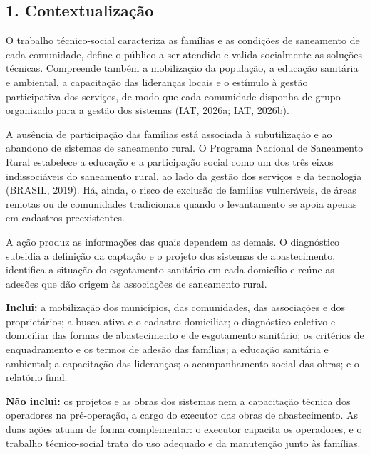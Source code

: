
{}
\subsection*{1. Contextualização}

O trabalho técnico-social caracteriza as famílias e as condições de saneamento de cada comunidade, define o público a ser atendido e valida socialmente as soluções técnicas. Compreende também a mobilização da população, a educação sanitária e ambiental, a capacitação das lideranças locais e o estímulo à gestão participativa dos serviços, de modo que cada comunidade disponha de grupo organizado para a gestão dos sistemas (IAT, 2026a; IAT, 2026b).

A ausência de participação das famílias está associada à subutilização e ao abandono de sistemas de saneamento rural. O Programa Nacional de Saneamento Rural estabelece a educação e a participação social como um dos três eixos indissociáveis do saneamento rural, ao lado da gestão dos serviços e da tecnologia (BRASIL, 2019). Há, ainda, o risco de exclusão de famílias vulneráveis, de áreas remotas ou de comunidades tradicionais quando o levantamento se apoia apenas em cadastros preexistentes.

A ação produz as informações das quais dependem as demais. O diagnóstico subsidia a definição da captação e o projeto dos sistemas de abastecimento, identifica a situação do esgotamento sanitário em cada domicílio e reúne as adesões que dão origem às associações de saneamento rural.

\textbf{Inclui:} a mobilização dos municípios, das comunidades, das associações e dos proprietários; a busca ativa e o cadastro domiciliar; o diagnóstico coletivo e domiciliar das formas de abastecimento e de esgotamento sanitário; os critérios de enquadramento e os termos de adesão das famílias; a educação sanitária e ambiental; a capacitação das lideranças; o acompanhamento social das obras; e o relatório final.

\textbf{Não inclui:} os projetos e as obras dos sistemas nem a capacitação técnica dos operadores na pré-operação, a cargo do executor das obras de abastecimento. As duas ações atuam de forma complementar: o executor capacita os operadores, e o trabalho técnico-social trata do uso adequado e da manutenção junto às famílias.


